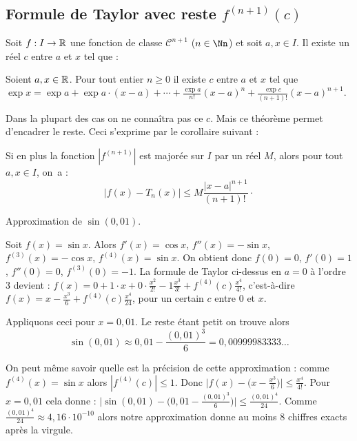 \documentclass[class=report,crop=false]{standalone}
\begin{document}

\subsection{Formule de Taylor avec reste $f^{(n+1)}(c)$}

\begin{theoreme}
Soit $f : I\to\mathbb{R}$ une fonction de classe $\mathcal{C}^{n+1}$ ($n \in \Nn$)
et soit $a,x \in I$.
Il existe un réel $c$ entre $a$ et $x$ tel que :

\end{theoreme}




\begin{exemple}
Soient $a,x \in\mathbb{R}$. Pour tout entier $n\ge0$ il existe $c$ entre $a$ et $x$ tel que
$\exp x=\exp a+\exp a \cdot (x-a)+\cdots+\frac{\exp a}{n!}(x-a)^n+\frac{\exp c}{(n+1)!}(x-a)^{n+1}.$
\end{exemple}

Dans la plupart des cas on ne connaîtra pas ce $c$. Mais ce théorème permet d'encadrer le reste.
Ceci s'exprime par le corollaire suivant :
\begin{corollaire}
Si en plus la fonction $|f^{(n+1)}|$ est majorée sur $I$ par un réel $M$, alors pour tout $a, x\in
I$, on~a :
\[
\big|f(x)-T_n(x)\big|\le M\frac{|x-a|^{n+1}}{(n+1)! \ } \cdotp
\]
\end{corollaire}

\begin{exemple}
Approximation de $\sin(0,01)$.

Soit $f(x)=\sin x$. Alors $f'(x)=\cos x$, $f''(x)=-\sin x$, $f^{(3)}(x)=-\cos x$, $f^{(4)}(x)=\sin x$.
On obtient donc $f(0)=0$, $f'(0)=1$, $f''(0)=0$, $f^{(3)}(0)=-1$.
La formule de Taylor ci-dessus en $a=0$ à l'ordre $3$ devient :
$f(x)=0+1\cdot x +0\cdot \frac{x^2}{2!}-1\frac{x^3}{3!} + f^{(4)}(c)\frac{x^4}{4!}$,
c'est-à-dire $f(x)= x -\frac{x^3}{6} + f^{(4)}(c)\frac{x^4}{24}$,
pour un certain $c$ entre $0$ et $x$.

Appliquons ceci pour $x=0,01$. Le reste étant petit on trouve
alors
\[
\sin(0,01) \approx 0,01 - \frac{(0,01)^3}{6}=0,00999983333\ldots
\]

On peut même savoir quelle est la précision de cette approximation :
comme $f^{(4)}(x)=\sin x$ alors  $|f^{(4)}(c)|\le 1$.
Donc
$\big|f(x) - \big(x -\frac{x^3}{6} \big) \big| \le \frac{x^4}{4!}$.
Pour $x=0,01$ cela donne :
$\big|\sin(0,01) -  \big(0,01 - \frac{(0,01)^3}{6}\big)\big| \le \frac{(0,01)^4}{24}$.
Comme $\frac{(0,01)^4}{24} \approx 4,16 \cdot 10^{-10}$ alors
notre approximation donne au moins $8$ chiffres exacts après la virgule.
\end{exemple}
\end{document}
